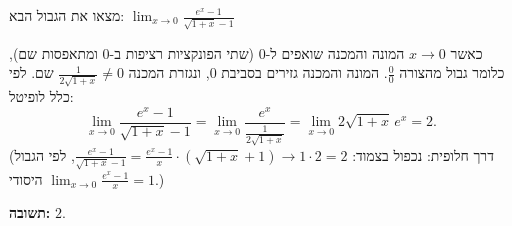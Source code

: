
\begin{question}
מצאו את הגבול הבא:
$\displaystyle \lim_{x\to 0}\frac{e^x-1}{\sqrt{1+x}-1}$
\end{question}

\begin{solution}
כאשר $x\to0$ המונה והמכנה שואפים ל-$0$ (שתי הפונקציות רציפות ב-$0$ ומתאפסות שם), כלומר גבול מהצורה $\frac00$. המונה והמכנה גזירים בסביבת $0$, ונגזרת המכנה $\frac{1}{2\sqrt{1+x}}\neq0$ שם. לפי כלל לופיטל:
\[
\lim_{x\to0}\frac{e^x-1}{\sqrt{1+x}-1}=\lim_{x\to0}\frac{e^x}{\frac{1}{2\sqrt{1+x}}}=\lim_{x\to0}2\sqrt{1+x}\,e^x=2.
\]
(דרך חלופית: נכפול בצמוד: $\frac{e^x-1}{\sqrt{1+x}-1}=\frac{e^x-1}{x}\cdot(\sqrt{1+x}+1)\to 1\cdot2=2$, לפי הגבול היסודי $\lim_{x\to0}\frac{e^x-1}{x}=1$.)

\textbf{תשובה:} $2$.
\end{solution}
